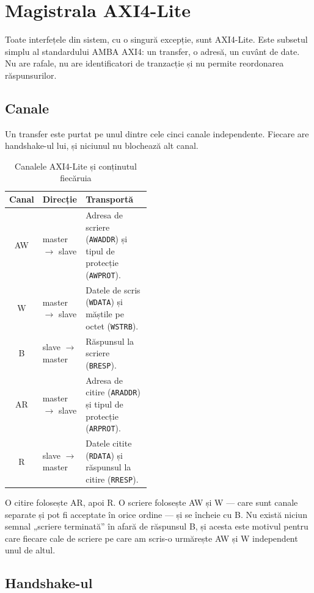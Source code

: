 \documentclass[11pt,openany]{report}
\newcommand{\sig}[1]{\texttt{#1}}
\begin{document}
\section{Magistrala AXI4-Lite}
\label{sec:axilite}

Toate interfețele din sistem, cu o singură excepție, sunt AXI4-Lite. Este
subsetul simplu al standardului AMBA AXI4: un transfer, o adresă, un cuvânt de
date. Nu are rafale, nu are identificatori de tranzacție și nu permite
reordonarea răspunsurilor.

\subsection{Canale}

Un transfer este purtat pe unul dintre cele cinci canale independente. Fiecare
are handshake-ul lui, și niciunul nu blochează alt canal.

\begin{table}[H]
\centering
\caption{Canalele AXI4-Lite și conținutul fiecăruia}
\label{tab:axichan}
\small
\begin{tabular}{@{}clL{0.46\linewidth}@{}}
\toprule
\textbf{Canal} & \textbf{Direcție} & \textbf{Transportă} \\
\midrule
AW & master $\rightarrow$ slave & Adresa de scriere (\sig{AWADDR}) și tipul de protecție (\sig{AWPROT}). \\
W  & master $\rightarrow$ slave & Datele de scris (\sig{WDATA}) și măștile pe octet (\sig{WSTRB}). \\
B  & slave $\rightarrow$ master & Răspunsul la scriere (\sig{BRESP}). \\
AR & master $\rightarrow$ slave & Adresa de citire (\sig{ARADDR}) și tipul de protecție (\sig{ARPROT}). \\
R  & slave $\rightarrow$ master & Datele citite (\sig{RDATA}) și răspunsul la citire (\sig{RRESP}). \\
\bottomrule
\end{tabular}
\end{table}

O citire folosește AR, apoi R. O scriere folosește AW și W --- care sunt canale
separate și pot fi acceptate în orice ordine --- și se încheie cu B. Nu există
niciun semnal „scriere terminată” în afară de răspunsul B, și acesta este
motivul pentru care fiecare cale de scriere pe care am scris-o urmărește AW și W
independent unul de altul.

\subsection{Handshake-ul}
\end{document}
